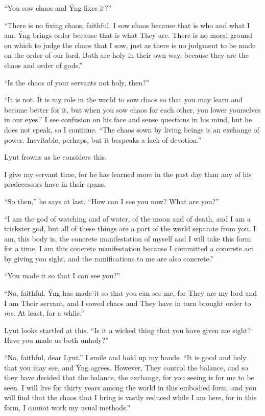 ``You sow chaos and Ýng fixes it?''

``There is no fixing chaos, faithful. I sow chaos because that is who and what I am. Ýng brings order because that is what They are. There is no moral ground on which to judge the chaos that I sow, just as there is no judgment to be made on the order of our lord. Both are holy in their own way, because they are the chaos and order of gods.''

``Is the chaos of your servants not holy, then?''

``It is not. It is my role in the world to sow chaos so that you may learn and become better for it, but when you sow chaos for each other, you lower yourselves in our eyes.'' I see confusion on his face and sense questions in his mind, but he does not speak, so I continue. ``The chaos sown by living beings is an exchange of power. Inevitable, perhaps, but it bespeaks a lack of devotion.''

Lyut frowns as he considers this.

I give my servant time, for he has learned more in the past day than any of his predecessors have in their spans.

``So then,'' he says at last. ``How can I see you now? What are you?''

``I am the god of watching and of water, of the moon and of death, and I am a trickster god, but all of these things are a part of the world separate from you. I am, this body is, the concrete manifestation of myself and I will take this form for a time. I am this concrete manifestation because I committed a concrete act by giving you sight, and the ramifications to me are also concrete.''

``You made it so that I can see you?''

``No, faithful. Ýng has made it so that you can see me, for They are my lord and I am Their servant, and I sowed chaos and They have in turn brought order to \emph{me}. At least, for a while.''

Lyut looks startled at this. ``Is it a wicked thing that you have given me sight? Have you made us both unholy?''

``No, faithful, dear Lyut.'' I smile and hold up my hands. ``It is good and holy that you may see, and Ýng agrees. However, They control the balance, and so they have decided that the balance, the exchange, for you seeing is for me to be seen. I will live for thirty years among the world in this embodied form, and you will find that the chaos that I bring is vastly reduced while I am here, for in this form, I cannot work my usual methods.''

